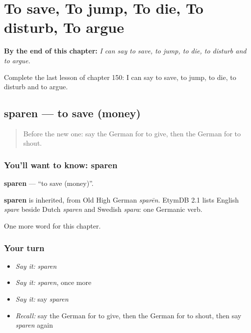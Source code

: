 
\chapter{To save, To jump, To die, To disturb, To argue}
\label{ch:ge-to-save-to-jump-to-die-to-disturb-to-argue}

\begin{chapteropening}
\textbf{By the end of this chapter:} \emph{I can say to save, to jump, to die, to disturb and to argue.}

Complete the last lesson of chapter 150: I can say to save, to jump, to die, to disturb and to argue.
\end{chapteropening}

\section[sparen]{sparen — to save (money)}

\label{lesson:GE-C150-sparen}



\begin{quote}
Before the new one: say the German for to give, then the German for to shout.
\end{quote}

\subsection*{You'll want to know: sparen}
\textbf{sparen} — \textquotedblleft{}to save (money)\textquotedblright{}.

\begin{cousinweb}
\textbf{sparen} is inherited, from Old High German \emph{sparēn}. EtymDB 2.1 lists English \emph{spare} beside Dutch \emph{sparen} and Swedish \emph{spara}: one Germanic verb.
\end{cousinweb}

\begin{grammarlens}[title={What you've built}]
One more word for this chapter.
\end{grammarlens}

\subsection*{Your turn}
\begin{itemize}
\raggedright
  \item \emph{Say it:} \emph{sparen}
  \item \emph{Say it:} \emph{sparen}, once more
  \item \emph{Say it:} say \emph{sparen}
  \item \emph{Recall:} say the German for to give, then the German for to shout, then say \emph{sparen} again
\end{itemize}

